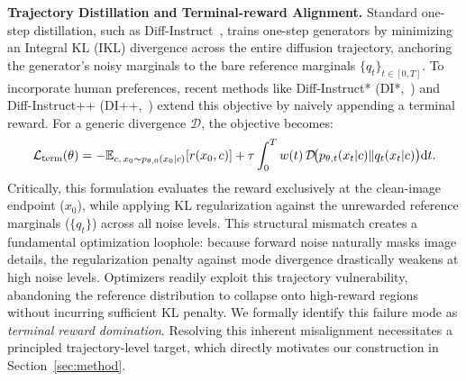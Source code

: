 \textbf{Trajectory Distillation and Terminal-reward Alignment.}
Standard one-step distillation, such as Diff-Instruct~\citep{Luo2023DiffInstructAU}, trains one-step generators by minimizing an Integral KL (IKL) divergence across the entire diffusion trajectory, anchoring the generator's noisy marginals to the bare reference marginals $\{q_t\}_{t\in[0,T]}$. To incorporate human preferences, recent methods like Diff-Instruct* (DI*,~\citep{luo2024onestep}) and Diff-Instruct++ (DI++,~\citep{anonymous2024diffinstruct}) extend this objective by naively appending a terminal reward. For a generic divergence $\mathcal{D}$, the objective becomes:
\begin{equation}
\mathcal{L}_{\mathrm{term}}(\theta)
= -\mathbb{E}_{c,\, x_0 \sim p_{\theta,0}(x_0|c)}[r(x_0,c)]
+ \tau\int_0^T w(t)\,\mathcal{D}\!\bigl(p_{\theta,t}(x_t|c)\|q_t(x_t|c)\bigr)\mathrm{d} t.
\label{eq:lterm}
\end{equation}
Critically, this formulation evaluates the reward exclusively at the clean-image endpoint ($x_0$), while applying KL regularization against the unrewarded reference marginals ($\{q_t\}$) across all noise levels. This structural mismatch creates a fundamental optimization loophole: because forward noise naturally masks image details, the regularization penalty against mode divergence drastically weakens at high noise levels. Optimizers readily exploit this trajectory vulnerability, abandoning the reference distribution to collapse onto high-reward regions without incurring sufficient KL penalty. We formally identify this failure mode as \emph{terminal reward domination}. Resolving this inherent misalignment necessitates a principled trajectory-level target, which directly motivates our construction in Section~\ref{sec:method}.

